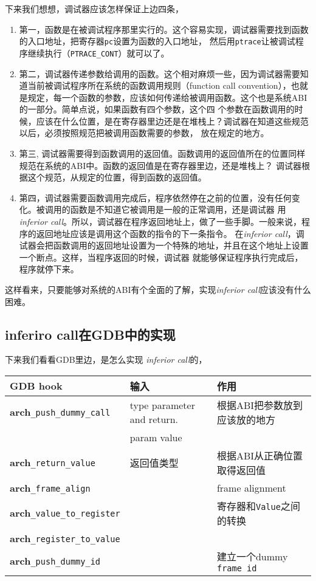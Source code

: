 下来我们想想，调试器应该怎样保证上边四条，
\begin{enumerate}
  \item 第一，函数是在被调试程序那里实行的。这个容易实现，调试器需要找到函数的入口地址，把寄存器\texttt{pc}设置为函数的入口地址，
    然后用\texttt{ptrace}让被调试程序继续执行（\texttt{PTRACE\_CONT}）就可以了。
  \item 第二，调试器传递参数给调用的函数。这个相对麻烦一些，因为调试器需要知道当前被调试程序所在系统的函数调用规则（function call
convention），也就是规定，每一个函数的参数，应该如何传递给被调用函数。这个也是系统ABI的一部分。简单点说，如果函数有四个参数，这个四
个参数在函数调用的时候，应该在什么位置，是在寄存器里边还是在堆栈上？调试器在知道这些规范以后，必须按照规范把被调用函数需要的参数，
放在规定的地方。
  \item 第三, 调试器需要得到函数调用的返回值。函数调用的返回值所在的位置同样规范在系统的ABI中。函数的返回值是在寄存器里边，还是堆栈上？
调试器根据这个规范，从规定的位置，得到函数的返回值。
  \item 第四，调试器需要函数调用完成后，程序依然停在之前的位置，没有任何变化。被调用的函数是不知道它被调用是一般的正常调用，还是调试器
用\textit{inferior call}。所以，调试器在程序返回地址上，做了一些手脚。一般来说，程序的返回地址应该是调用这个函数的指令的下一条指令。
在\textit{inferior call}，调试器会把函数调用的返回地址设置为一个特殊的地址，并且在这个地址上设置一个断点。这样，当程序返回的时候，调试器
就能够保证程序执行完成后，程序就停下来。
\end{enumerate}

这样看来，只要能够对系统的ABI有个全面的了解，实现\textit{inferior call}应该没有什么困难。

\subsection {inferiro call在GDB中的实现}
下来我们看看GDB里边，是怎么实现
\textit{inferior call}的，
\begin{table}
  \begin{tabular}{|l|l|l|} \hline
    GDB hook&输入&作用\\ \hline
    \tiny\textbf{arch}\texttt{\_push\_dummy\_call}&\tiny type parameter and return.&\tiny 根据ABI把参数放到应该放的地方\\&\tiny param value&\\ \hline

    \tiny\textbf{arch}\texttt{\_return\_value}&\tiny 返回值类型&\tiny 根据ABI从正确位置取得返回值\\ \hline

    \tiny\textbf{arch}\texttt{\_frame\_align}&&\tiny frame alignment\\ \hline

    \tiny\textbf{arch}\texttt{\_value\_to\_register}&& \tiny 寄存器和\texttt{Value}之间的转换\\
    \tiny\textbf{arch}\texttt{\_register\_to\_value}&&\\ \hline
    \tiny\textbf{arch}\texttt{\_push\_dummy\_id} &&\tiny 建立一个dummy \texttt{frame id}\\ \hline
  \end{tabular}
\end{table}

